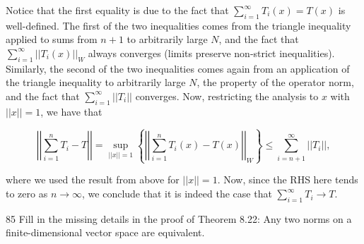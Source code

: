 \begin{solution}
    Notice that the first equality is due to the fact that $\sum_{i=1}^{\infty} T_i(x) = T(x)$ is well-defined.
    The first of the two inequalities comes from the triangle inequality applied to sums from $n + 1$ to arbitrarily large $N$, and the fact that $\sum_{i=1}^{\infty} \lvert \lvert T_i(x) \rvert \rvert_W$ always converges (limits preserve non-strict inequalities).
    Similarly, the second of the two inequalities comes again from an application of the triangle inequality  to arbitrarily large $N$, the property of the operator norm, and the fact that $\sum_{i=1}^{\infty} \lvert \lvert T_i \rvert \rvert$ converges.
    Now, restricting the analysis to $x$ with $\lvert \lvert x \rvert \rvert = 1$, we have that

    \[\left\vert \left\vert \sum_{i=1}^{n} T_i - T \right\vert \right\vert = \sup_{\lvert \lvert x \rvert \rvert = 1} \left\{ \left\vert \left\vert \sum_{i=1}^{n} T_i(x) - T(x) \right\vert \right\vert_W \right\} \leq \sum_{i=n + 1}^{\infty} \lvert \lvert T_i \rvert \rvert,\]

    where we used the result from above for $\lvert \lvert x \rvert \rvert = 1$.
    Now, since the RHS here tends to zero as $n \rightarrow \infty$, we conclude that it is indeed the case that $\sum_{i=1}^{\infty} T_i \rightarrow T$.
\end{solution}

\begin{exercise}{85}
    Fill in the missing details in the proof of Theorem 8.22: Any two norms on a finite-dimensional vector space are equivalent.
\end{exercise}

